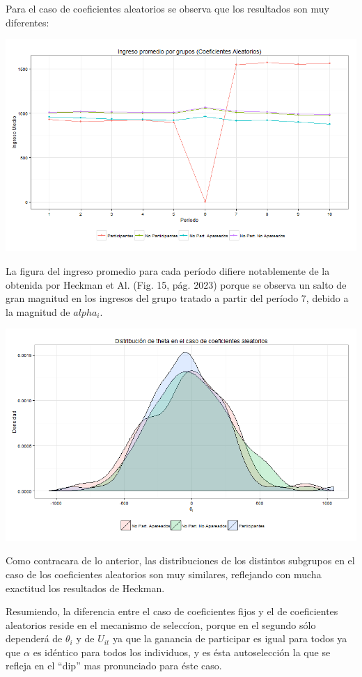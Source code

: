 \documentclass[]{article}
\begin{document}
Para el caso de coeficientes aleatorios se observa que los resultados
son muy diferentes:

\includegraphics{DipRandom.png}

La figura del ingreso promedio para cada período difiere notablemente de
la obtenida por Heckman et Al. (Fig. 15, pág. 2023) porque se observa un
salto de gran magnitud en los ingresos del grupo tratado a partir del
período 7, debido a la magnitud de $alpha_{i}$.

\includegraphics{ThetaRand.png}

Como contracara de lo anterior, las distribuciones de los distintos
subgrupos en el caso de los coeficientes aleatorios son muy similares,
reflejando con mucha exactitud los resultados de Heckman.

Resumiendo, la diferencia entre el caso de coeficientes fijos y el de
coeficientes aleatorios reside en el mecanismo de seleccíon, porque en
el segundo sólo dependerá de $\theta_{i}$ y de $U_{it}$ ya que la
ganancia de participar es igual para todos ya que $\alpha$ es idéntico
para todos los individuos, y es ésta autoselección la que se refleja en
el ``dip'' mas pronunciado para éste caso.
\end{document}
